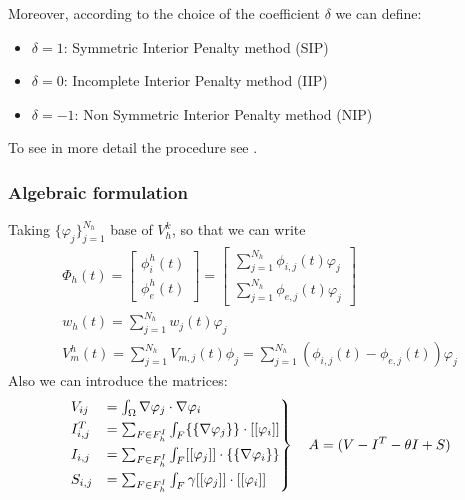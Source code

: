 \documentclass[a4paper,12pt]{article}
\begin{document}
    Moreover, according to the choice of the coefficient $\delta$ we can define:
    \begin{itemize}
    \item $\delta=1$: Symmetric Interior Penalty method (SIP)
    \item $\delta=0$: Incomplete Interior Penalty method (IIP)
    \item $\delta=-1$: Non Symmetric Interior Penalty method (NIP) 
    \end{itemize} 
    To see in more detail the procedure see \cite{marta}.
    
    \subsubsection{Algebraic formulation}
    Taking $\{\varphi_j\}_{j=1}^{N_h}$ base of $V_h^k$, so that we can write
    \begin{equation*}
    \begin{gathered}
    \Phi_h(t) = \begin{bmatrix} \phi_i^h(t) \\ \phi_e^h(t) \end{bmatrix} = \begin {bmatrix}\sum_{j=1}^{N_h} \phi_{i,j}(t)\varphi_j \\ \sum_{j=1}^{N_h} \phi_{e,j}(t)\varphi_j \end{bmatrix}\\
    w_h(t) = \sum_{j=1}^{N_h}w_j(t)\varphi_j\\
    V_m^h(t)=\sum_{j=1}^{N_h} V_{m,j}(t) \phi_j=\sum_{j=1}^{N_h}(\phi_{i,j}(t)-\phi_{e,j}(t))\varphi_j
 \end{gathered}
 \end{equation*}
 Also we can introduce the matrices:
 \begin{equation}
\begin{rcases}
V_{ij} &= \int_{\Omega}\nabla\varphi_j \cdot \nabla \varphi_i 
\\ I_{i,j}^T &= \sum_{F \in F_h^I} \int_{F} \{\{\nabla\varphi_j\}\} \cdot [[\varphi_i]] 
\\ I_{i,j} &= \sum_{F \in F_h^I} \int_{F} [[\varphi_j]] \cdot \{\{\nabla \varphi_i\}\}
\\S_{i,j} &= \sum_{F \in F_h^I} \int_{F} \gamma [[\varphi_j]] \cdot [[\varphi_i]]
\end{rcases}
\begin{gathered}
\quad A = (V -I^T - \theta I + S)\\
\end{gathered}
\end{equation}
\end{document}
